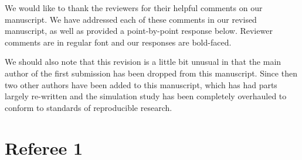 \documentclass[letterpaper,12pt]{article}\usepackage[]{graphicx}\usepackage[]{color}
\begin{document}
 We would like to thank the reviewers for their helpful comments on our manuscript.  We have addressed each of these comments in our revised manuscript, as well as provided a point-by-point response below. Reviewer comments are in regular font and our responses are bold-faced.  
 
 We should also note that this revision is a little bit unusual in that the main author of the first submission has been dropped from this manuscript.  Since then two other authors have been added to this manuscript, which has had parts largely re-written and the simulation study has been completely overhauled to conform to standards of reproducible research.  

\section{Referee 1}
\end{document}
